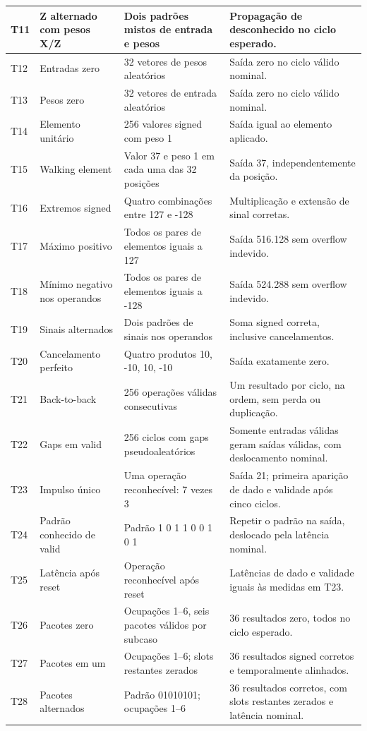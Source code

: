 \documentclass[12pt,a4paper]{article}
\begin{document}
\begin{longtable}{|p{1.1cm}|p{4.5cm}|p{7cm}|p{10cm}|}
T11 & Z alternado com pesos X/Z & Dois padrões mistos de entrada e pesos & Propagação de desconhecido no ciclo esperado. \\\hline
T12 & Entradas zero & 32 vetores de pesos aleatórios & Saída zero no ciclo válido nominal. \\\hline
T13 & Pesos zero & 32 vetores de entrada aleatórios & Saída zero no ciclo válido nominal. \\\hline
T14 & Elemento unitário & 256 valores signed com peso 1 & Saída igual ao elemento aplicado. \\\hline
T15 & Walking element & Valor 37 e peso 1 em cada uma das 32 posições & Saída 37, independentemente da posição. \\\hline
T16 & Extremos signed & Quatro combinações entre 127 e -128 & Multiplicação e extensão de sinal corretas. \\\hline
T17 & Máximo positivo & Todos os pares de elementos iguais a 127 & Saída 516.128 sem overflow indevido. \\\hline
T18 & Mínimo negativo nos operandos & Todos os pares de elementos iguais a -128 & Saída 524.288 sem overflow indevido. \\\hline
T19 & Sinais alternados & Dois padrões de sinais nos operandos & Soma signed correta, inclusive cancelamentos. \\\hline
T20 & Cancelamento perfeito & Quatro produtos 10, -10, 10, -10 & Saída exatamente zero. \\\hline
T21 & Back-to-back & 256 operações válidas consecutivas & Um resultado por ciclo, na ordem, sem perda ou duplicação. \\\hline
T22 & Gaps em valid & 256 ciclos com gaps pseudoaleatórios & Somente entradas válidas geram saídas válidas, com deslocamento nominal. \\\hline
T23 & Impulso único & Uma operação reconhecível: 7 vezes 3 & Saída 21; primeira aparição de dado e validade após cinco ciclos. \\\hline
T24 & Padrão conhecido de valid & Padrão 1 0 1 1 0 0 1 0 1 & Repetir o padrão na saída, deslocado pela latência nominal. \\\hline
T25 & Latência após reset & Operação reconhecível após reset & Latências de dado e validade iguais às medidas em T23. \\\hline
T26 & Pacotes zero & Ocupações 1--6, seis pacotes válidos por subcaso & 36 resultados zero, todos no ciclo esperado. \\\hline
T27 & Pacotes em um & Ocupações 1--6; slots restantes zerados & 36 resultados signed corretos e temporalmente alinhados. \\\hline
T28 & Pacotes alternados & Padrão 01010101; ocupações 1--6 & 36 resultados corretos, com slots restantes zerados e latência nominal. \\\hline
\end{longtable}
\normalsize
\end{document}
